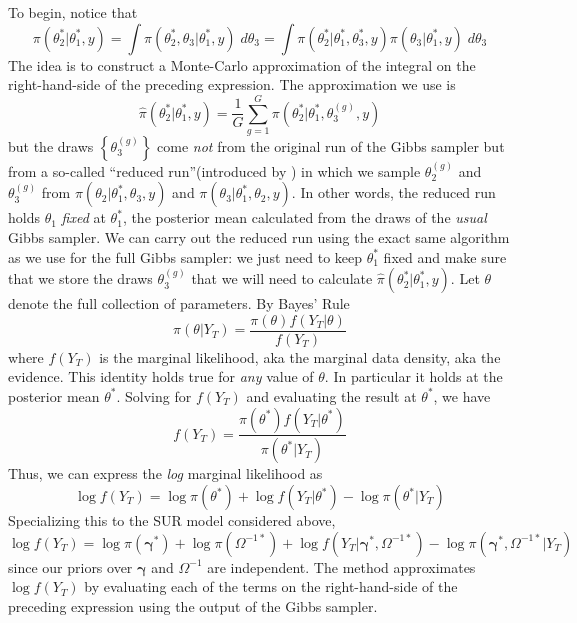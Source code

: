 \documentclass[12pt]{article}
\begin{document}
To begin, notice that
\begin{equation*}
\pi\left( \theta^*_2|\theta^*_1, y \right) = \int \pi(\theta^*_2, \theta_3|\theta_1^*,y) \; d\theta_3 = \int \pi(\theta_2^*|\theta^*_1, \theta^*_3,y)\pi(\theta_3|\theta^*_1,y) \; d\theta_3
\end{equation*}
The idea is to construct a Monte-Carlo approximation of the integral on the right-hand-side of the preceding expression.
The approximation we use is
\begin{equation*}
\hat{\pi}\left( \theta_2^*|\theta^*_1,y \right) = \frac{1}{G} \sum_{g = 1}^G \pi(\theta_2^*|\theta_1^*, \theta_3^{(g)},y)
\end{equation*}
but the draws $\left\{ \theta_3^{(g)} \right\}$ come \emph{not} from the original run of the Gibbs sampler but from a so-called ``reduced run''(introduced by \cite{chib1995marginal}) in which we sample $\theta_2^{(g)}$ and $\theta_3^{(g)}$ from $\pi(\theta_2|\theta_1^*,\theta_3, y)$ and $\pi(\theta_3|\theta_1^*,\theta_2,y)$.
In other words, the reduced run holds $\theta_1$ \emph{fixed} at $\theta^*_1$, the posterior mean calculated from the draws of the \emph{usual} Gibbs sampler.
We can carry out the reduced run using the exact same algorithm as we use for the full Gibbs sampler: we just need to keep $\theta^*_1$ fixed and make sure that we store the draws $\theta_3^{(g)}$ that we will need to calculate $\hat{\pi}(\theta^*_2|\theta_1^*,y)$.
Let $\theta$ denote the full collection of parameters.
By Bayes' Rule
\begin{equation*}
\pi\left( \theta | Y_T \right) = \frac{\pi(\theta)f(Y_T|\theta)}{f(Y_T)}  
\end{equation*}
where $f(Y_T)$ is the marginal likelihood, aka the marginal data density, aka the evidence.
This identity holds true for \emph{any} value of $\theta$.
In particular it holds at the posterior mean $\theta^*$.
Solving for $f(Y_T)$ and evaluating the result at $\theta^*$, we have 
\begin{equation*}
f\left(Y_T \right) = \frac{\pi(\theta^*)f(Y_T|\theta^*)}{\pi(\theta^*|Y_T)}  
\end{equation*}
Thus, we can express the \emph{log} marginal likelihood as
\begin{equation*}
\log f(Y_T) = \log \pi(\theta^*) + \log f\left( Y_T|\theta^* \right) - \log \pi\left( \theta^*|Y_T \right)
\end{equation*}
Specializing this to the SUR model considered above,
\begin{equation*}
\log f(Y_T) = \log \pi(\boldsymbol{\gamma}^*) + \log \pi\left( \Omega^{-1*} \right) + \log f\left( Y_T|\boldsymbol{\gamma}^*, \Omega^{-1*} \right) - \log \pi\left( \boldsymbol{\gamma}^*, \Omega^{-1*}|Y_T \right)
\end{equation*}
since our priors over $\boldsymbol{\gamma}$ and $\Omega^{-1}$ are independent. The \cite{chib1995marginal} method approximates $\log f(Y_T)$ by evaluating each of the terms on the right-hand-side of the preceding expression using the output of the Gibbs sampler.
\end{document}
